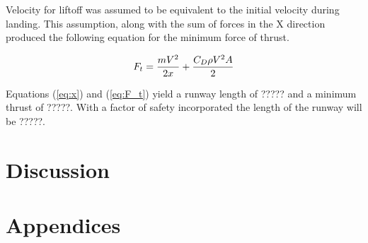 \documentclass[
	12pt, %
]{refrigeration_report_style}
\begin{document}
\noindent Velocity for liftoff was assumed to be equivalent to the initial velocity during landing. This assumption, along with the sum of forces in the X direction produced the following equation for the minimum force of thrust.

\begin{equation}
    F_{t} = \frac{mV^2}{2x} + \frac{C_{D} \rho V^2 A}{2} 
    \label{eq:F_t} \\
\end{equation}


Equations (\ref{eq:x}) and (\ref{eq:F_t}) yield a runway length of ????? and a minimum thrust of ?????. With a factor of safety incorporated the length of the runway will be ?????.  

\section{Discussion}
\lipsum[1]




\section{Appendices}


\par
\bigskip

\newpage
{}   %
\printbibliography[heading=bibintoc, title={References}]

\end{document}
